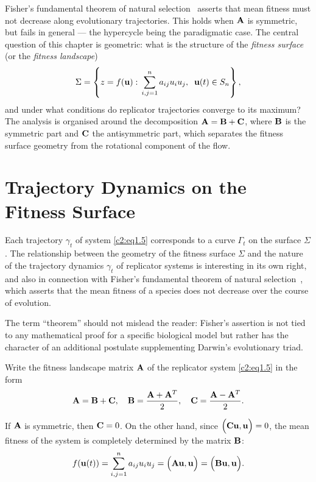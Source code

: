 \documentclass[12pt]{report}
\theoremstyle{definition}
\theoremstyle{remark}
\begin{document}
Fisher's fundamental theorem of natural selection~\cite{c2:Fisher1930,c2:Crow2002} asserts that
mean fitness must not decrease along evolutionary trajectories. This holds when
${\bf A}$ is symmetric, but fails in general --- the hypercycle being the
paradigmatic case. The central question of this chapter is geometric: what is
the structure of the \textit{fitness surface} (or the \textit{fitness landscape})
$$
    \Sigma = \left\{z = f({\bf u}) :\,
    \sum\limits_{i,j=1}^{n} a_{ij}u_i u_j,\;\; {\bf u}(t) \in S_n \right\},
$$
and under what conditions do replicator trajectories converge to its maximum?
The analysis is organised around the decomposition ${\bf A} = {\bf B} + {\bf C}$,
where ${\bf B}$ is the symmetric part and ${\bf C}$ the antisymmetric part,
which separates the fitness surface geometry from the rotational component of the
flow.

\section{Trajectory Dynamics on the Fitness Surface}\label{c2:section:2.1}

Each trajectory $\gamma_{t}$ of system \eqref{c2:eq1.5} corresponds to a curve $\Gamma_{t}$ on the surface $\Sigma$. The relationship between the geometry of the fitness surface $\Sigma$ and the nature of the trajectory dynamics $\gamma_{t}$ of replicator systems is interesting in its own right, and also in connection with Fisher's fundamental theorem of natural selection~\cite{c2:Fisher1930}, which asserts that the mean fitness of a species does not decrease over the course of evolution.

The term ``theorem'' should not mislead the reader: Fisher's assertion is not tied to any mathematical proof for a specific biological model but rather has the character of an additional postulate supplementing Darwin's evolutionary triad.

Write the fitness landscape matrix ${\bf A}$ of the replicator system \eqref{c2:eq1.5} in the form
\begin{equation}
	{\bf A} = {\bf B} + {\bf C}, \quad {\bf B} = \frac{{\bf A} + {\bf A}^{T}}{2}, \quad {\bf C} = \frac{{\bf A} - {\bf A}^{T}}{2}.
	\label{c2:eq2.1}
\end{equation}

If ${\bf A}$ is symmetric, then ${\bf C} = 0$. On the other hand, since $\Big({\bf Cu, u}\Big) = 0$, the mean fitness of the system is completely determined by the matrix ${\bf B}$:
$$
f({\bf u}(t)) = \sum\limits_{i, j = 1}^{n}a_{ij}u_{i}u_{j} = \Big({\bf Au, u}\Big) = \Big({\bf Bu, u}\Big).
$$
\end{document}
